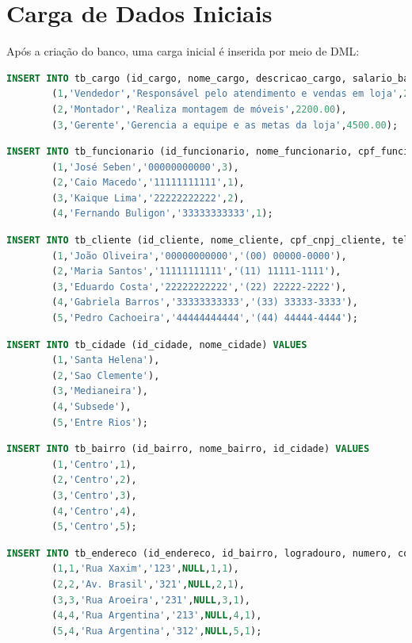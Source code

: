 \documentclass[
12pt,
a4paper,
semrecuonosumario,
sumario = abnt-6027-2012]{report}
\begin{document}
    \section{Carga de Dados Iniciais}\label{sec:carga}
    Após a criação do banco, uma carga inicial é inserida por meio de DML:

    \begin{lstlisting}[language=SQL,caption={DML -- Tabela \texttt{tb\_cargo}}]
		INSERT INTO tb_cargo (id_cargo, nome_cargo, descricao_cargo, salario_base) VALUES
		(1,'Vendedor','Responsável pelo atendimento e vendas em loja',2000.00),
		(2,'Montador','Realiza montagem de móveis',2200.00),
		(3,'Gerente','Gerencia a equipe e as metas da loja',4500.00);
    \end{lstlisting}
    \begin{lstlisting}[language=SQL,caption={DML -- Tabela \texttt{tb\_funcionario}}]
		INSERT INTO tb_funcionario (id_funcionario, nome_funcionario, cpf_funcionario, id_cargo) VALUES
		(1,'José Seben','00000000000',3),
		(2,'Caio Macedo','11111111111',1),
		(3,'Kaique Lima','22222222222',2),
		(4,'Fernando Buligon','33333333333',1);
    \end{lstlisting}
    \begin{lstlisting}[language=SQL,caption={DML -- Tabela \texttt{tb\_cliente}}]
		INSERT INTO tb_cliente (id_cliente, nome_cliente, cpf_cnpj_cliente, telefone_cliente) VALUES
		(1,'João Oliveira','00000000000','(00) 00000-0000'),
		(2,'Maria Santos','11111111111','(11) 11111-1111'),
		(3,'Eduardo Costa','22222222222','(22) 22222-2222'),
		(4,'Gabriela Barros','33333333333','(33) 33333-3333'),
		(5,'Pedro Cachoeira','44444444444','(44) 44444-4444');
    \end{lstlisting}

    \begin{lstlisting}[language=SQL,caption={DML -- Tabela \texttt{tb\_cidade}}]
		INSERT INTO tb_cidade (id_cidade, nome_cidade) VALUES
		(1,'Santa Helena'),
		(2,'Sao Clemente'),
		(3,'Medianeira'),
		(4,'Subsede'),
		(5,'Entre Rios');
    \end{lstlisting}

    \begin{lstlisting}[language=SQL,caption={DML -- Tabela \texttt{tb\_bairro}}]
		INSERT INTO tb_bairro (id_bairro, nome_bairro, id_cidade) VALUES
		(1,'Centro',1),
		(2,'Centro',2),
		(3,'Centro',3),
		(4,'Centro',4),
		(5,'Centro',5);
    \end{lstlisting}

    \begin{lstlisting}[language=SQL,caption={DML -- Tabela \texttt{tb\_endereco}}]
		INSERT INTO tb_endereco (id_endereco, id_bairro, logradouro, numero, complemento, id_cliente, prioridade) VALUES
		(1,1,'Rua Xaxim','123',NULL,1,1),
		(2,2,'Av. Brasil','321',NULL,2,1),
		(3,3,'Rua Aroeira','231',NULL,3,1),
		(4,4,'Rua Argentina','213',NULL,4,1),
		(5,4,'Rua Argentina','312',NULL,5,1);
    \end{lstlisting}
\end{document}
